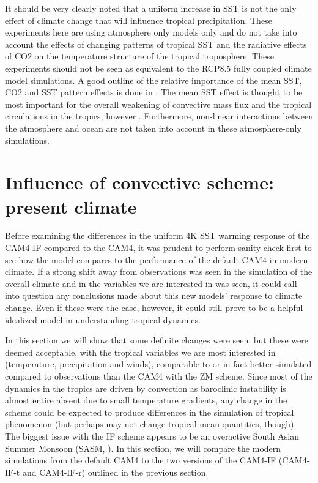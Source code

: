 \documentclass[letterpaper,12pt,titlepage,oneside,final]{book}
\begin{document}
It should be very clearly noted that a uniform increase in SST is not the only effect of climate change that will influence tropical precipitation. These experiments here are using atmosphere only models only and do not take into account the effects of changing patterns of tropical SST and the radiative effects of CO2 on the temperature structure of the tropical troposphere. These experiments should not be seen as equivalent to the RCP8.5 fully coupled climate model simulations. A good outline of the relative importance of the mean SST, CO2 and SST pattern effects is done in \citep{he_anthropogenic_2015}. The mean SST effect is thought to be most important for the overall weakening of convective mass flux and the tropical circulations in the tropics, however \citep{held_robust_2006,ma_mechanisms_2011,vecchi_global_2007,he_anthropogenic_2015}. Furthermore, non-linear interactions between the atmosphere and ocean are not taken into account in these atmosphere-only simulations.

\chapter{Influence of convective scheme: present climate}

Before examining the differences in the uniform 4K SST warming response of the CAM4-IF compared to the CAM4, it was prudent to perform sanity check first to see how the model compares to the performance of the default CAM4 in modern climate. If a strong shift away from observations was seen in the simulation of the overall climate and in the variables we are interested in was seen, it could call into question any conclusions made about this new models' response to climate change. Even if these were the case, however, it could still prove to be a helpful idealized model in understanding tropical dynamics. 

In this section we will show that some definite changes were seen, but these were deemed acceptable, with the tropical variables we are most interested in (temperature, precipitation and winds), comparable to or in fact better simulated compared to observations than the CAM4 with the ZM scheme. Since most of the dynamics in the tropics are driven by convection as baroclinic instability is almost entire absent due to small temperature gradients, any change in the scheme could be expected to produce differences in the simulation of tropical phenomenon (but perhaps may not change tropical mean quantities, though). The biggest issue with the IF scheme appears to be an overactive South Asian Summer Monsoon (SASM, \cite{fan_future_2012}). In this section, we will compare the modern simulations from the default CAM4 to the two versions of the CAM4-IF (CAM4-IF-t and CAM4-IF-r) outlined in the previous section.
\end{document}
